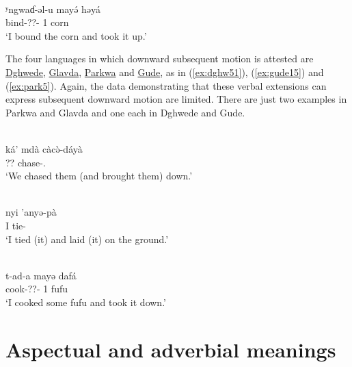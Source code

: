 \ex\label{ex:park01}
 \\
\gll ʸngwaɗ-əl-u mayə́ həyá	\\
bind-??- 1 corn		\\
\glt `I bound the corn and took it up.'
\z

The four languages in which downward subsequent motion is attested are \hyperref[dghw]{Dghwede}, \hyperref[glav]{Glavda}, \hyperref[park]{Parkwa} and \hyperref[gude]{Gude}, as in (\ref{ex:dghw51}), (\ref{ex:gude15}) and (\ref{ex:park5}). Again, the data demonstrating that these verbal extensions can express subsequent downward motion are limited. There are just two examples in Parkwa and Glavda and one each in Dghwede and Gude. 

\ea\label{ex:dghw51}
 \\
\gll ká' mdà càcə̀-dáyà	\\
  ?? chase-.	\\
\glt `We chased them (and brought them) down.'

\ex\label{ex:gude15}
 \\
\gll  nyi 'anyə-pà \\
I tie-	\\
\glt `I tied (it) and laid (it) on the ground.'

\ex\label{ex:park5}
 \\
\gll t-ad-a mayə dafá	\\
cook-??- 1 fufu	 \\
\glt `I cooked some fufu and took it down.'
\z 

\section{Aspectual and adverbial meanings} \label{sec:cogrammatical}


